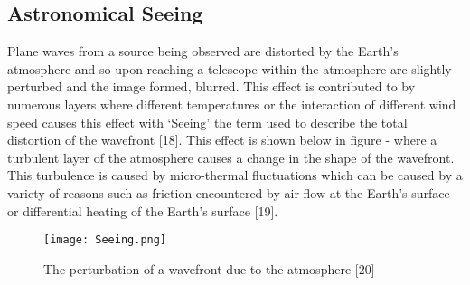 \documentclass[pdf,color]{UoBnote}
\begin{document}
\subsection{Astronomical Seeing}
Plane waves from a source being observed are distorted by the Earth’s atmosphere and so upon reaching a telescope within the atmosphere are slightly perturbed and the image formed, blurred. This effect is contributed to by numerous layers where different temperatures or the interaction of different wind speed causes this effect with ‘Seeing’ the term used to describe the total distortion of the wavefront [18]. This effect is shown below in figure - where a turbulent layer of the atmosphere causes a change in the shape of the wavefront. This turbulence is caused by micro-thermal fluctuations which can be caused by a variety of reasons such as friction encountered by air flow at the Earth’s surface or differential heating of the Earth’s surface [19].\\
\newline
\begin{figure}[H]
\begin{center}
\texttt{[image: Seeing.png]}
\end{center}
\caption{The perturbation of a wavefront due to the atmosphere [20]}\label{fig:figure1}
\end{figure}
\end{document}
